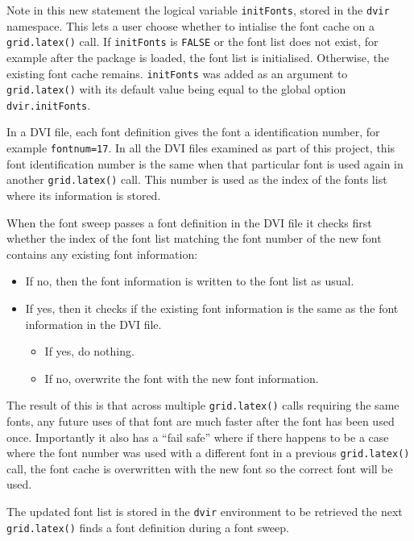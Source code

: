 \documentclass[]{article}
\begin{document}
Note in this new statement the logical variable \texttt{initFonts},
stored in the \texttt{dvir} namespace. This lets a user choose whether
to intialise the font cache on a \texttt{grid.latex()} call. If
\texttt{initFonts} is \texttt{FALSE} or the font list does not exist,
for example after the package is loaded, the font list is initialised.
Otherwise, the existing font cache remains. \texttt{initFonts} was added
as an argument to \texttt{grid.latex()} with its default value being
equal to the global option \texttt{dvir.initFonts}.

In a DVI file, each font definition gives the font a identification
number, for example \texttt{fontnum=17}. In all the DVI files examined
as part of this project, this font identification number is the same
when that particular font is used again in another \texttt{grid.latex()}
call. This number is used as the index of the fonts list where its
information is stored.

When the font sweep passes a font definition in the DVI file it checks
first whether the index of the font list matching the font number of the
new font contains any existing font information:

\begin{itemize}
  \item If no, then the font information is written to the font list as usual.
  \item If yes, then it checks if the existing font information is the same as the font information in the DVI file. 
  \begin{itemize}
    \item If yes, do nothing. 
    \item If no, overwrite the font with the new font information.
  \end{itemize}
\end{itemize}

The result of this is that across multiple \texttt{grid.latex()} calls
requiring the same fonts, any future uses of that font are much faster
after the font has been used once. Importantly it also has a ``fail
safe'' where if there happens to be a case where the font number was
used with a different font in a previous \texttt{grid.latex()} call, the
font cache is overwritten with the new font so the correct font will be
used.

The updated font list is stored in the \texttt{dvir} environment to be
retrieved the next \texttt{grid.latex()} finds a font definition during
a font sweep.
\end{document}
